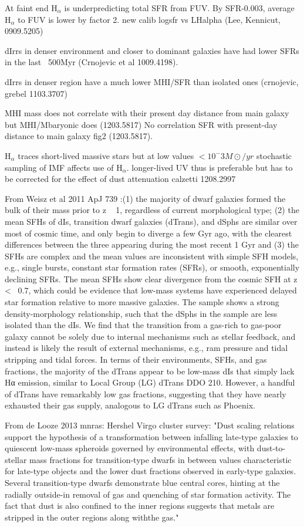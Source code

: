 \documentclass[12pt,preprint]{emulateapj}
\begin{document}
At faint end H$_\alpha$ is underpredicting total SFR from FUV. By SFR-0.003, average H$_\alpha$ to FUV is lower by factor 2. new calib logsfr vs LHalpha 
(Lee, Kennicut, 0909.5205)

dIrrs in denser environment and closer to dominant galaxies have had lower SFRs in the last ~500Myr (Crnojevic et al 1009.4198).

dIrrs in denser region have a much lower MHI/SFR than isolated ones (crnojevic, grebel 1103.3707)

MHI mass does not correlate with their present day distance from main galaxy but MHI/Mbaryonic does (1203.5817)
No correlation SFR with present-day distance to main galaxy fig2 (1203.5817).

H$_\alpha$ traces short-lived massive stars but at low values $<10^-3 M\odot/yr$ stochastic sampling of IMF affects use of H$_\alpha$. longer-lived UV thus 
is preferable but has to be corrected for the effect of dust attenuation calzetti 1208.2997

From Weisz et al 2011 ApJ 739 :(1) the majority of dwarf galaxies formed the bulk of their mass prior to z ~ 1, 
regardless of current morphological type; (2) the mean SFHs of dIs, transition dwarf galaxies (dTrans), and dSphs 
are similar over most of cosmic time, and only begin to diverge a few Gyr ago, with the clearest differences between 
the three appearing during the most recent 1 Gyr and (3) the SFHs are complex and the mean values are inconsistent 
with simple SFH models, e.g., single bursts, constant star formation rates (SFRs), or smooth, exponentially declining SFRs.
 The mean SFHs show clear divergence from the cosmic SFH at z <~ 0.7, which could be evidence that low-mass systems have 
experienced delayed star formation relative to more massive galaxies. The sample shows a strong density-morphology 
relationship, such that the dSphs in the sample are less isolated than the dIs. We find that the transition from a 
gas-rich to gas-poor galaxy cannot be solely due to internal mechanisms such as stellar feedback, and instead is likely 
the result of external mechanisms, e.g., ram pressure and tidal stripping and tidal forces. In terms of their environments,
 SFHs, and gas fractions, the majority of the dTrans appear to be low-mass dIs that simply lack Hα emission, similar to 
Local Group (LG) dTrans DDO 210. However, a handful of dTrans have remarkably low gas fractions, 
suggesting that they have nearly exhausted their gas supply, analogous to LG dTrans such as Phoenix. 

From de Looze 2013 mnras: Hershel Virgo cluster survey: "Dust scaling relations support the hypothesis of a transformation 
between infalling late-type galaxies to quiescent low-mass spheroids governed by environmental effects, with 
dust-to-stellar mass fractions for transition-type dwarfs in between values characteristic for late-type objects and 
the lower dust fractions observed in early-type galaxies. Several transition-type dwarfs demonstrate blue central cores, 
hinting at the radially outside-in removal of gas and quenching of star formation activity. The fact that dust is also 
confined to the inner regions suggests that metals are stripped in the outer regions along withthe gas."
\end{document}
